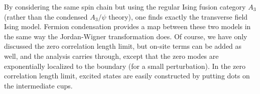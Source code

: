 
By considering the same spin chain but using the regular Ising fusion category $A_3$ (rather than the condensed $A_3/\psi$ theory), one finds exactly the transverse field Ising model. 
Fermion condensation provides a map between these two models in the same way the Jordan-Wigner transformation does.
Of course, we have only discussed the zero correlation length limit, but on-site terms can be added as well, and the analysis carries through, except that the zero modes are exponentially localized to the boundary (for a small perturbation).
In the zero correlation length limit, excited states are easily constructed by putting dots on the intermediate cups. 

